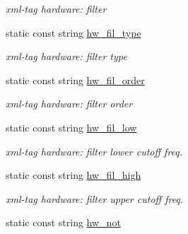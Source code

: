 \begin{DoxyCompactItemize}
\begin{DoxyCompactList}\small\item\em xml-\/tag hardware: filter \item\end{DoxyCompactList}\item 
\hypertarget{class_constants_ab874cba7cbc1cd80986e5e2048d623c2}{
static const string \hyperlink{class_constants_ab874cba7cbc1cd80986e5e2048d623c2}{hw\_\-fil\_\-type}}
\label{class_constants_ab874cba7cbc1cd80986e5e2048d623c2}

\begin{DoxyCompactList}\small\item\em xml-\/tag hardware: filter type \item\end{DoxyCompactList}\item 
\hypertarget{class_constants_aa207ddb2d41abcd54769cb7c798b82ab}{
static const string \hyperlink{class_constants_aa207ddb2d41abcd54769cb7c798b82ab}{hw\_\-fil\_\-order}}
\label{class_constants_aa207ddb2d41abcd54769cb7c798b82ab}

\begin{DoxyCompactList}\small\item\em xml-\/tag hardware: filter order \item\end{DoxyCompactList}\item 
\hypertarget{class_constants_ac20f05225d82755ee205288ad8f8ea94}{
static const string \hyperlink{class_constants_ac20f05225d82755ee205288ad8f8ea94}{hw\_\-fil\_\-low}}
\label{class_constants_ac20f05225d82755ee205288ad8f8ea94}

\begin{DoxyCompactList}\small\item\em xml-\/tag hardware: filter lower cutoff freq. \item\end{DoxyCompactList}\item 
\hypertarget{class_constants_a3a6cc8e92eac248fa93ff9f932303216}{
static const string \hyperlink{class_constants_a3a6cc8e92eac248fa93ff9f932303216}{hw\_\-fil\_\-high}}
\label{class_constants_a3a6cc8e92eac248fa93ff9f932303216}

\begin{DoxyCompactList}\small\item\em xml-\/tag hardware: filter upper cutoff freq. \item\end{DoxyCompactList}\item 
\hypertarget{class_constants_a4a41d175f238dbd2b845a8f982f770eb}{
static const string \hyperlink{class_constants_a4a41d175f238dbd2b845a8f982f770eb}{hw\_\-not}}
\label{class_constants_a4a41d175f238dbd2b845a8f982f770eb}


\end{DoxyCompactItemize}
